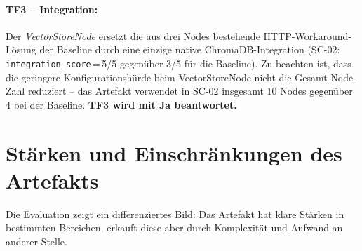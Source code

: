\documentclass[12pt,a4paper,oneside]{report}
\begin{document}
\paragraph{TF3 -- Integration:}
Der \textit{VectorStoreNode} ersetzt die aus drei Nodes bestehende HTTP-Workaround-Lösung
der Baseline durch eine einzige native ChromaDB-Integration
(SC-02: \texttt{integration\_score}\,=\,5/5 gegenüber 3/5 für die Baseline). Zu beachten ist,
dass die geringere Konfigurationshürde beim VectorStoreNode nicht die Gesamt-Node-Zahl
reduziert -- das Artefakt verwendet in SC-02 insgesamt 10 Nodes gegenüber 4 bei der Baseline.
\textbf{TF3 wird mit Ja beantwortet.}

\section{Stärken und Einschränkungen des Artefakts}

Die Evaluation zeigt ein differenziertes Bild: Das Artefakt hat klare Stärken in
bestimmten Bereichen, erkauft diese aber durch Komplexität und Aufwand an anderer
Stelle.
\end{document}
